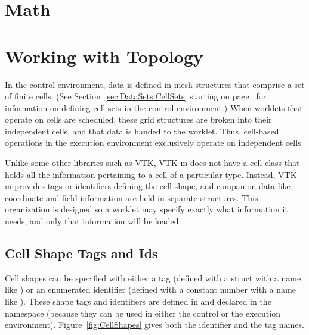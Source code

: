 
\section{Math}


\section{Working with Topology}
\label{sec:ExecutionEnvironment:WorkingWithTopology}

In the control environment, data is defined in mesh structures that
comprise a set of finite cells. (See Section~\ref{sec:DataSets:CellSets}
starting on page~\pageref{sec:DataSets:CellSets} for information on
defining cell sets in the control environment.) When worklets that operate
on cells are scheduled, these grid structures are broken into their
independent cells, and that data is handed to the worklet. Thus, cell-based
operations in the execution environment exclusively operate on independent
cells.

Unlike some other libraries such as VTK, VTK-m does not have a cell class
that holds all the information pertaining to a cell of a particular type.
Instead, VTK-m provides tags or identifiers defining the cell shape, and
companion data like coordinate and field information are held in separate
structures. This organization is designed so a worklet may specify exactly
what information it needs, and only that information will be loaded.

\subsection{Cell Shape Tags and Ids}
\label{sec:CellShapeTagsIds}


Cell shapes can be specified with either a tag (defined with a struct with
a name like ) or an enumerated identifier
(defined with a constant number with a name like
). These shape tags and identifiers are
defined in  and declared in the \vtkm{}
namespace (because they can be used in either the control or the execution
environment). Figure~\ref{fig:CellShapes} gives both the identifier and the
tag names.

